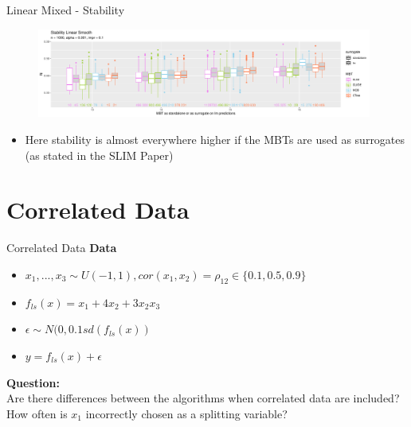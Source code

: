 \documentclass[9pt, xcolor=table]{beamer}
\begin{document}
\begin{frame}{Linear Mixed - Stability}

\begin{figure}
    \includegraphics[width=11cm]{Figures/simulations/batchtools/basic_scenarios/linear_mixed/lm_1000_standalone_lm_sta.pdf}
\end{figure}     
\begin{itemize}
    \item Here stability is almost everywhere higher if the MBTs are used as surrogates (as stated in the SLIM Paper)
\end{itemize}

\end{frame}


\section{Correlated Data}
\begin{frame}{Correlated Data}
\textbf{Data}
\begin{itemize}
    \item $x_1,..., x_3 \sim U(-1,1), cor(x_1,x_2) = \rho_{12} \in \{0.1, 0.5, 0.9\}$ 
    \item $ f_{ls}(x) = x_1 + 4   x_2 + 3   x_2   x_3 $
    \item $\epsilon \sim N(0, 0.1 sd(f_{ls}(x))$
    \item $y = f_{ls}(x) + \epsilon$
\end{itemize}

\textbf{Question:} \\
Are there differences between the algorithms when correlated data are included? How often is $x_1$ incorrectly chosen as a splitting variable?
    
\end{frame}
\end{document}
